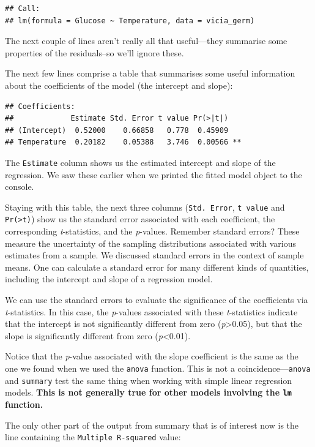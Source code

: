 \documentclass[
]{book}
\begin{document}
\begin{verbatim}
## Call: 
## lm(formula = Glucose ~ Temperature, data = vicia_germ)
\end{verbatim}

The next couple of lines aren't really all that useful---they summarise some properties of the residuals--so we'll ignore these.

The next few lines comprise a table that summarises some useful information about the coefficients of the model (the intercept and slope):

\begin{verbatim}
## Coefficients: 
##             Estimate Std. Error t value Pr(>|t|)    
## (Intercept)  0.52000    0.66858   0.778  0.45909    
## Temperature  0.20182    0.05388   3.746  0.00566 **
\end{verbatim}

The \texttt{Estimate} column shows us the estimated intercept and slope of the regression. We saw these earlier when we printed the fitted model object to the console.

Staying with this table, the next three columns (\texttt{Std.\ Error}, \texttt{t\ value} and \texttt{Pr(\textgreater{}\textbar{}t\textbar{})}) show us the standard error associated with each coefficient, the corresponding \emph{t}-statistics, and the \emph{p}-values. Remember standard errors? These measure the uncertainty of the sampling distributions associated with various estimates from a sample. We discussed standard errors in the context of sample means. One can calculate a standard error for many different kinds of quantities, including the intercept and slope of a regression model.

We can use the standard errors to evaluate the significance of the coefficients via \emph{t}-statistics. In this case, the \emph{p}-values associated with these \emph{t}-statistics indicate that the intercept is not significantly different from zero (\emph{p}\textgreater0.05), but that the slope is significantly different from zero (\emph{p}\textless0.01).

Notice that the \emph{p}-value associated with the slope coefficient is the same as the one we found when we used the \texttt{anova} function. This is not a coincidence---\texttt{anova} and \texttt{summary} test the same thing when working with simple linear regression models. \textbf{This is not generally true for other models involving the \texttt{lm} function.}

The only other part of the output from summary that is of interest now is the line containing the \texttt{Multiple\ R-squared} value:
\end{document}
